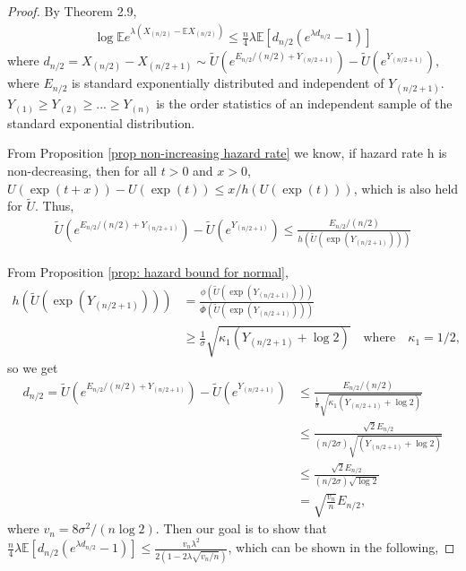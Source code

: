 \documentclass{article}
\theoremstyle{plain}
\begin{document}
\begin{proof}
By \cite{boucheron2012} Theorem 2.9, 
\begin{align}
    \log \mathbb{E} e^{\lambda\left(X_{(n / 2)}-\mathbb{E} X_{(n / 2)}\right)} \leq \frac{n}{4} \lambda \mathbb{E}\left[d_{n / 2}\left(e^{\lambda d_{n / 2}}-1\right)\right]
\end{align}
where $d_{n / 2}=X_{(n / 2)}-X_{(n / 2+1)} \sim \tilde{U}\left(e^{E_{n / 2} /(n / 2)+Y_{(n / 2+1)}} \right)- \tilde{U}\left(e^{Y_{(n / 2+1)}}\right),$ where $E_{n/2}$ is standard exponentially distributed and independent of $Y_{(n/2 + 1)}$. $Y_{(1)} \geq Y_{(2)} \geq ... \geq Y_{(n)}$ is the order statistics of an independent sample of the standard exponential distribution. 

From Proposition \ref{prop non-increasing hazard rate} we know, if hazard rate h is non-decreasing, then for all $t > 0$ and $x > 0$, $U(\exp (t+x))-U(\exp (t)) \leq x / h(U(\exp (t)))$, which is also held for $\tilde{U}$. Thus, 
\begin{align}
    \tilde{U}\left(e^{E_{n / 2} /(n / 2)+Y_{(n / 2+1)}} \right)- \tilde{U}\left(e^{Y_{(n / 2+1)}}\right) \leq \frac{E_{n / 2} /(n / 2)}{h(\tilde{U}(\exp{(Y_{(n/2+1)})}))}
\end{align}

From Proposition \ref{prop: hazard bound for normal}, 
\begin{align}
    h(\tilde{U}(\exp{(Y_{(n/2+1)})})) &= \frac{\phi(\widetilde{U}(\exp (Y_{(n/2+1)})))}{\overline{\Phi}(\widetilde{U}(\exp (Y_{(n/2+1)})))}\\
    &\geq \frac{1}{\sigma} \sqrt{\kappa_1 (Y_{(n/2+1)} + \log 2)} \quad \text{where} \quad \kappa_1 = 1/2,
\end{align}
so we get 
\begin{align}
    d_{n/2} = \tilde{U}\left(e^{E_{n / 2} /(n / 2)+Y_{(n / 2+1)}} \right)-\tilde{U}\left(e^{Y_{(n / 2+1)}}\right) 
    &\leq \frac{E_{n / 2} /(n / 2)}{\frac{1}{\sigma} \sqrt{\kappa_1 (Y_{(n/2+1)} + \log 2)}}\\
    &\leq \frac{ \sqrt{2} E_{n / 2} }{(n/2\sigma)\sqrt{(Y_{(n/2+1)} + \log 2)}}\\
    &\leq \frac{ \sqrt{2} E_{n / 2} }{(n/2\sigma)\sqrt{ \log 2}}\\
    &= \sqrt{\frac{v_{n}}{n}} E_{n / 2},
\end{align}
where $v_{n}=8 \sigma^2 /(n \log 2)$.
Then our goal is to show that $\frac{n}{4} \lambda \mathbb{E}\left[d_{n / 2}\left(e^{\lambda d_{n / 2}}-1\right)\right] \leq \frac{v_{n} \lambda^{2}}{2\left(1-2 \lambda \sqrt{v_{n} / n}\right)}$, which can be shown in the following,


\end{proof}
\end{document}
